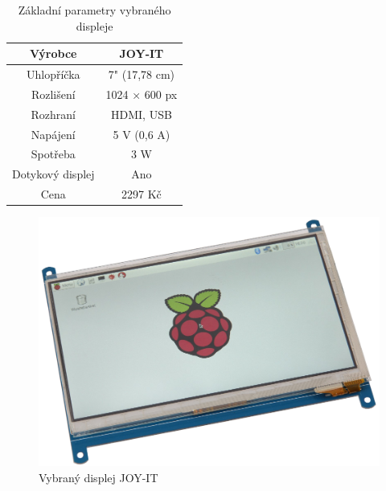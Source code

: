 \begin{table}[!h]
    \centering
    \begin{tabular}{|c|c|}
        \hline
        Výrobce                                                         & JOY-IT   \\ \hline
        Uhlopříčka                                                      & 7" (17,78 cm)  \\ \hline
        Rozlišení                                                        & 1024 × 600 px    \\ \hline
         Rozhraní 
            & HDMI, USB \\ \hline
        Napájení & 5 V (0,6 A) \\ \hline
        Spotřeba & 3 W \\ \hline
        Dotykový displej                                                        & Ano     \\ \hline
        Cena                                                            & 2297 Kč     \\ \hline
    \end{tabular}
    \caption{Základní parametry vybraného displeje}
    \label{displeej}
\end{table}



\begin{figure}[!h]
    \begin{center}
        \includegraphics[scale=0.22]{obrazky/Displej.png}
    \end{center}
    \caption{Vybraný displej JOY-IT \cite{displej}}
\end{figure}

